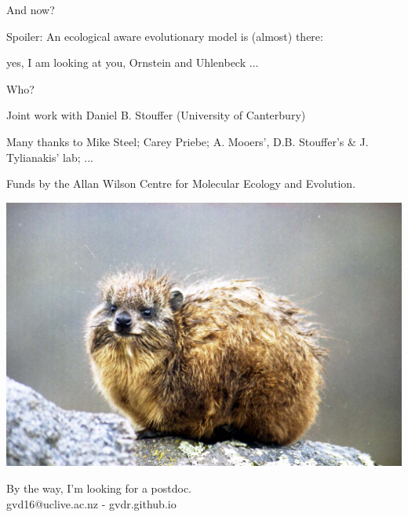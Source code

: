 \documentclass[]{beamer}
\begin{document}
\begin{frame}{And now?}

  Spoiler: An ecological aware evolutionary model is (almost) there:
  
  \small yes, I am looking at you, Ornstein and Uhlenbeck $\dots$

\end{frame}

\begin{frame}{Who?}

\begin{centering}
\small{
Joint work with  
Daniel B. Stouffer (University of Canterbury)

Many thanks to  
Mike Steel; Carey Priebe; A. Mooers', D.B. Stouffer's \& J. Tylianakis' lab; ...

Funds by the Allan Wilson Centre for Molecular Ecology and Evolution.}

\centering
  \includegraphics[width=0.4\linewidth]{images/hyrax.jpg}

\small{By the way, I'm looking for a postdoc.\\ gvd16@uclive.ac.nz - gvdr.github.io}

\end{centering}

\end{frame}
\end{document}
